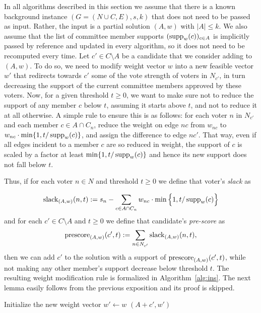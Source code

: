 In all algorithms described in this section we assume that there is a known background instance $(G=(N\cup C, E), s, k)$ that does not need to be passed as input. Rather, the input is a partial solution $(A,w)$ with $|A|\leq k$. We also assume that the list of committee member supports $(\operatorname{supp}_w(c))_{c\in A}$ is implicitly passed by reference and updated in every algorithm, so it does not need to be recomputed every time.
%
Let $c'\in C\setminus A$ be a candidate that we consider adding to $(A,w)$. To do so, we need to modify weight vector $w$ into a new feasible vector $w'$ that redirects towards $c'$ some of the vote strength of voters in $N_{c'}$, in turn decreasing the support of the current committee members approved by these voters. Now, for a given threshold $t\geq 0$, we want to make sure not to reduce the support of any member $c$ below $t$, assuming it starts above $t$, and not to reduce it at all otherwise. A simple rule to ensure this is as follows: for each voter $n$ in $N_{c'}$ and each member $c\in A\cap C_n$, reduce the weight on edge $nc$ from $w_{nc}$ to $w_{nc}\cdot \min\{1, t/\operatorname{supp}_w(c)\}$, and assign the difference to edge $nc'$. That way, even if all edges incident to a member $c$ are so reduced in weight, the support of $c$ is scaled by a factor at least $\min\{1, t/\operatorname{supp}_w(c)\}$ and hence its new support does not fall below $t$.

Thus, if for each voter $n\in N$ and threshold $t\geq 0$ we define that voter's \emph{slack} as

\begin{align}
    \operatorname{slack}_{(A,w)}(n,t):= s_n - \sum_{c\in A\cap C_n} w_{nc} \cdot\min \Big\{ 1, t/\operatorname{supp}_w(c)\Big\} \label{eq:slack}
\end{align}
%
and for each $c'\in C\setminus A$ and $t\geq 0$ we define that candidate's \emph{pre-score} as
%
\begin{equation}\label{eq:prescore}
    \operatorname{prescore}_{(A,w)}(c',t) := \sum_{n\in N_{c'}} \operatorname{slack}_{(A,w)}(n,t),
\end{equation}
%
then we can add $c'$ to the solution with a support of $\operatorname{prescore}_{(A,w)}(c',t)$, while not making any other member's support decrease below threshold $t$. The resulting weight modification rule is formalized in Algorithm~\ref{alg:ins}. The next lemma easily follows from the previous exposition and its proof is skipped.

\begin{algorithm}[htb]\label{alg:ins}
\SetAlgoLined
{}
Initialize the new weight vector $w'\leftarrow w$\;
\Return $(A+c',w')$\;
 \caption{$\ins(A,w,c',t)$}
\end{algorithm}


